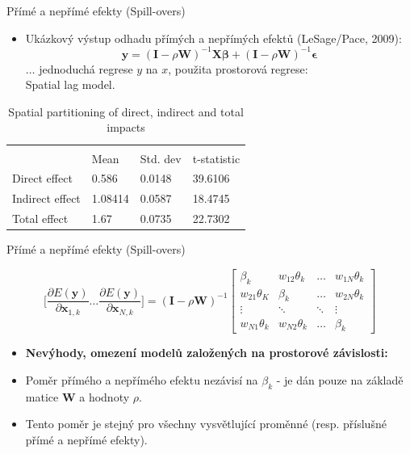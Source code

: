 \documentclass{beamer}
\begin{document}
\begin{frame}{Přímé a nepřímé efekty (Spill-overs)}
\begin{itemize}
	\item Ukázkový výstup odhadu přímých a nepřímých efektů (LeSage/Pace, 2009):
	$$\bm{y} = (\bm{I} - \rho \bm{W})^{-1} \bm{X}\bm{\beta} + (\bm{I} - \rho \bm{W})^{-1} \bm{\epsilon}$$
	$\dots$ jednoduchá regrese $y$ na $x$, použita prostorová regrese: \\
	Spatial lag model.
	
	\end{itemize}
\begin{table}[]
\centering
\caption{Spatial partitioning of direct, indirect and total   impacts}
\begin{tabular}{llll}
&         &          &             \\
                                                                                                       & Mean    & Std. dev & t-statistic \\
Direct effect                                                                                          & 0.586   & 0.0148   & 39.6106     \\
Indirect effect                                                                                        & 1.08414 & 0.0587   & 18.4745     \\
Total effect                                                                                           & 1.67    & 0.0735   & 22.7302    
\end{tabular}
\end{table}
\end{frame}
\begin{frame}{Přímé a nepřímé efekty (Spill-overs)}

$$ \bigg[\frac{\partial E(\bm{y})}{\partial \bm{x}_{1,k}} \dots \frac{\partial E(\bm{y})}{\partial \bm{x}_{N,k}}\bigg] =
(\bm{I} - \rho \bm{W})^{-1} 
\begin{bmatrix}
\beta_k & w_{12}\theta_k & \dots & w_{1N}\theta_k \\
w_{21}\theta_K & \beta_k & \dots & w_{2N}\theta_k \\
\vdots & \ddots & \ddots & \vdots \\
w_{N1}\theta_k & w_{N2}\theta_k & \dots & \beta_k 
\end{bmatrix}
$$
\begin{itemize}
	\item \textbf{Nevýhody, omezení modelů založených na prostorové závislosti:}
	\item Poměr přímého a nepřímého efektu nezávisí na $\beta_k$ - je dán pouze na základě matice $\bm{W}$ a hodnoty $\rho$. 
	\item Tento poměr je stejný pro všechny vysvětlující proměnné (resp. příslušné přímé a nepřímé efekty).
\end{itemize}

\end{frame}
\end{document}
